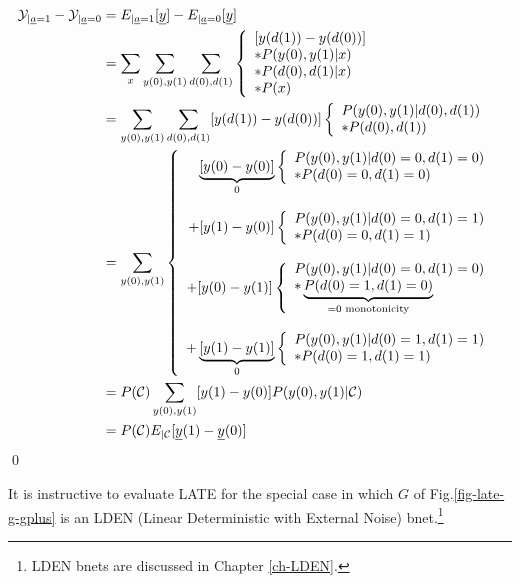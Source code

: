 \begin{align}
\caly_{|\rva=1}-
\caly_{|\rva=0}
&=
E_{|\rva=1}[\rvy]
-
E_{|\rva=0}[\rvy]
\\
&=
\sum_x
\sum_{y(0), y(1)}
\sum_{d(0), d(1)}
\left\{
\begin{array}{l}
[y(d(1))-y(d(0))]
\\
*P(y(0), y(1)|x)
\\
*P(d(0), d(1)|x)
\\
*P(x)
\end{array}
\right.
\\
&=
\sum_{y(0), y(1)}
\sum_{d(0), d(1)}
[y(d(1))-y(d(0))]
\left\{
\begin{array}{l}
P(y(0), y(1)|d(0), d(1))
\\
*P(d(0), d(1))
\end{array}
\right.
\\
&=
\sum_{y(0), y(1)}
\left\{
\begin{array}{r}
\underbrace{[y(0)-y(0)]}_{0}
\left\{
\begin{array}{l}
P(y(0), y(1)|d(0)=0, d(1)=0)
\\
*P(d(0)=0, d(1)=0)
\end{array}
\right.
\\
\\
+
[y(1)-y(0)]
\left\{
\begin{array}{l}
P(y(0), y(1)|d(0)=0, d(1)=1)
\\
*P(d(0)=0, d(1)=1)
\end{array}
\right.
\\
\\
+
[y(0)-y(1)]
\left\{
\begin{array}{l}
P(y(0), y(1)|d(0)=0, d(1)=0)
\\
*\underbrace{P(d(0)=1, d(1)=0)}
_{=0 \text{  monotonicity}}
\end{array}
\right.
\\
\\
+
\underbrace{[y(1)-y(1)]}_{0}
\left\{
\begin{array}{l}
P(y(0), y(1)|d(0)=1, d(1)=1)
\\
*P(d(0)=1, d(1)=1)
\end{array}
\right.
\end{array}
\right.
\\
&=
P(\calc)
\sum_{y(0), y(1)}
[y(1)-y(0)]
P(y(0), y(1)|\calc)
\\
&=
P(\calc)
E_{|\calc}[\rvy(1)-\rvy(0)]
\end{align}
\qed

It
is instructive
to evaluate 
LATE for
the special case 
in which $G$
of
Fig.\ref{fig-late-g-gplus}
is an LDEN (Linear
Deterministic
with External
 Noise) bnet.\footnote{LDEN bnets are discussed in Chapter
 \ref{ch-LDEN}.}
 
